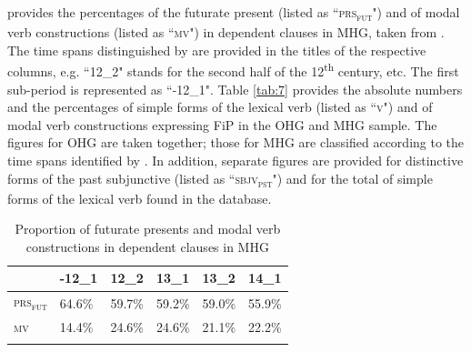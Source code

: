 \documentclass[output=paper,colorlinks,citecolor=brown]{langscibook}
\begin{document}
 provides the percentages of the futurate present (listed as ``\textsc{prs}\textsubscript{\textsc{fut}}") and of modal verb constructions (listed as ``\textsc{mv}") in dependent clauses in MHG, taken from \citet[92, Table 2 and 93, Table 3]{Luther2013}. The time spans distinguished by \citet{Luther2013} are provided in the titles of the respective columns, e.g. ``12\_2" stands for the second half of the 12\textsuperscript{th} century, etc. The first sub-period is represented as ``-12\_1". Table \ref{tab:7} provides the absolute numbers and the percentages of simple forms of the lexical verb (listed as ``\textsc{v}") and of modal verb constructions expressing FiP in the OHG and MHG sample. The figures for OHG are taken together; those for MHG are classified according to the time spans identified by \citet{Luther2013}. In addition, separate figures are provided for distinctive forms of the past subjunctive (listed as ``\textsc{sbjv}\textsubscript{\textsc{pst}}") and for the total of simple forms of the lexical verb found in the database. 

\begin{table}
    \begin{tabularx}{\textwidth}{QYYYYY}
        \lsptoprule
        & {-12\_1} & {12\_2} & {13\_1} & {13\_2} & {14\_1} \\
        \midrule
        {\textsc{prs}\textsubscript{\textsc{fut}}} & 64.6\% & 59.7\% & 59.2\% & 59.0\% & 55.9\% \\
        {\textsc{mv}} & 14.4\% & 24.6\% & 24.6\% & 21.1\% & 22.2\% \\
        \lspbottomrule
    \end{tabularx}
    \caption{Proportion of futurate presents and modal verb constructions in dependent clauses in MHG \citep[92, Table 2 and 93, Table~3]{Luther2013}}
    \label{tab:6}
\end{table}
\end{document}
